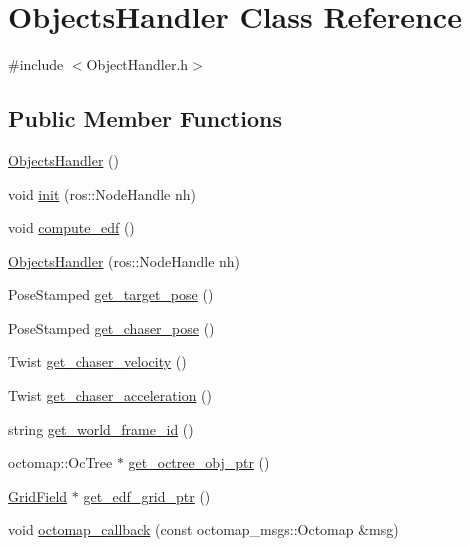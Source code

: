 \hypertarget{class_objects_handler}{}\section{Objects\+Handler Class Reference}
\label{class_objects_handler}


{\ttfamily \#include $<$Object\+Handler.\+h$>$}

\subsection*{Public Member Functions}
\begin{DoxyCompactItemize}
\item 
\hyperlink{class_objects_handler_a932c6bc722daa78f4f8e31894911c4c7}{Objects\+Handler} ()
\item 
void \hyperlink{class_objects_handler_a1ac7fcad5fa6033c2435ac49f2f9dff5}{init} (ros\+::\+Node\+Handle nh)
\item 
void \hyperlink{class_objects_handler_ae6da4f0f0a265c75722e02d68d519f07}{compute\+\_\+edf} ()
\item 
\hyperlink{class_objects_handler_a5d3298d7029619c1931d3dda34278e05}{Objects\+Handler} (ros\+::\+Node\+Handle nh)
\item 
Pose\+Stamped \hyperlink{class_objects_handler_a2b9e69afe54afea0380431d8f1f5142d}{get\+\_\+target\+\_\+pose} ()
\item 
Pose\+Stamped \hyperlink{class_objects_handler_a4ac7a7bb712575c2ff6ffbf37144cf56}{get\+\_\+chaser\+\_\+pose} ()
\item 
Twist \hyperlink{class_objects_handler_aa1af309b0e964ccb6df8dede045fa32b}{get\+\_\+chaser\+\_\+velocity} ()
\item 
Twist \hyperlink{class_objects_handler_a41d48832b07a4d4276147a99dd1d31bc}{get\+\_\+chaser\+\_\+acceleration} ()
\item 
string \hyperlink{class_objects_handler_a07e9d105db04be181661dc979314de3c}{get\+\_\+world\+\_\+frame\+\_\+id} ()
\item 
octomap\+::\+Oc\+Tree $\ast$ \hyperlink{class_objects_handler_a988bdf05045c40348b34ae8beecd8884}{get\+\_\+octree\+\_\+obj\+\_\+ptr} ()
\item 
\hyperlink{struct_grid_field}{Grid\+Field} $\ast$ \hyperlink{class_objects_handler_afe849882d1feeef8316a45632381da54}{get\+\_\+edf\+\_\+grid\+\_\+ptr} ()
\item 
void \hyperlink{class_objects_handler_a5744110d979850b3e2d8896793435d0c}{octomap\+\_\+callback} (const octomap\+\_\+msgs\+::\+Octomap \&msg)

\end{DoxyCompactItemize}
